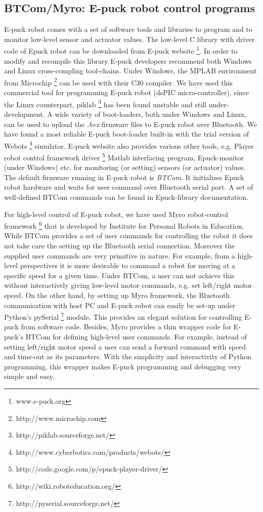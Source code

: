 \subsection{BTCom/Myro: E-puck robot control programs}
\label{expt-tools:btcom}
E-puck robot comes with a set of software tools and libraries to program and to monitor low-level sensor and actuator values. The low-level C library with driver code of Epuck robot can be downloaded from E-puck website \footnote{www.e-puck.org}. In order to modify and recompile this library E-puck developers recommend both Windows and Linux cross-compling tool-chains. Under Windows, the MPLAB  environment from Microchip \footnote{http://www.microchip.com} can be used with their C30 compiler. We have used this  commercial tool for programming E-puck robot (dsPIC micro-controller), since the Linux counterpart, piklab \footnote{http://piklab.sourceforge.net/} has been found unstable and still under-development. A wide variety of boot-loaders, both under Windows and Linux,  can be used to upload the {\em .hex} firmware files to E-puck robot over Bluetooth. We have found a most reliable E-puck boot-loader  built-in with the trial version  of Webots \footnote{http://www.cyberbotics.com/products/webots/} simulator.  E-puck website also provides various other tools, e.g. Player robot control framework driver \footnote{http://code.google.com/p/epuck-player-driver/} Matlab interfacing program, Epuck-monitor (under Windows) etc. for monitoring (or setting) sensors (or actuator) values.  The default firmware running in E-puck robot is {\em BTCom}.  It initializes  Epuck robot  hardware and waits for user command over Bluetooth serial port. A set of well-defined BTCom commands can be found in Epuck-library documentation. 

For high-level control of E-puck robot, we have used Myro robot-control framework \footnote{http://wiki.roboteducation.org/} that is developed by Institute for Personal Robots in Education. While BTCom provides a set of user commands for controlling the robot it does not take care the setting up the Bluetooth serial connection. Moreover the supplied user commands are very primitive in nature. For example, from a high-level perspectives it is more desirable to command a robot for moving at a specific speed for a given time. Under BTCom, a user can not achieve this without interactively giving low-level motor commands, e.g. set left/right motor speed.  On the other hand, by setting up Myro framework, the Bluetooth communication with host PC and E-puck robot can easily be set-up under Python's pySerial \footnote{http://pyserial.sourceforge.net/} module. This provides an elegant solution for controlling E-puck from software code. Besides, Myro provides a thin wrapper code for E-puck's BTCom for defining high-level user commands. For example, instead of setting left/right motor speed a user can send a forward command with  speed and time-out as its parameters. With the simplicity and interactivity of Python programming, this wrapper makes E-puck programming and debugging very simple and easy. 

